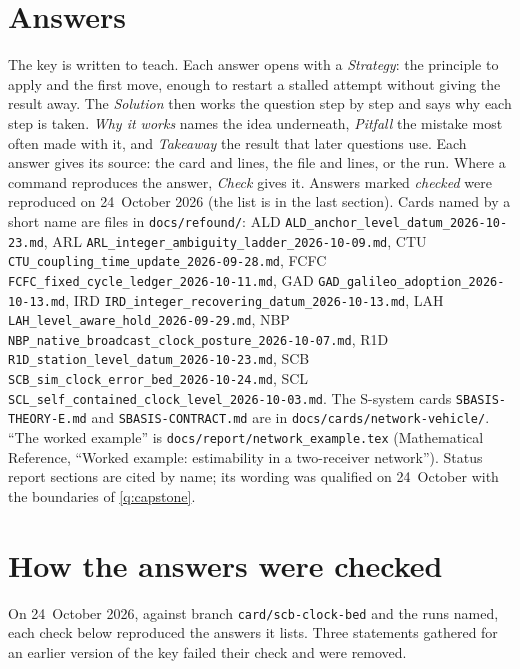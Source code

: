 \documentclass[11pt,letterpaper]{article}
\newcounter{question}[section]
\begin{document}
\clearpage
\section*{Answers}
The key is written to teach. Each answer opens with a \emph{Strategy}: the
principle to apply and the first move, enough to restart a stalled attempt
without giving the result away. The \emph{Solution} then works the question
step by step and says why each step is taken. \emph{Why it works} names the
idea underneath, \emph{Pitfall} the mistake most often made with it, and
\emph{Takeaway} the result that later questions use. Each answer gives its
source: the card and lines, the file and lines, or the run. Where a command
reproduces the answer, \emph{Check} gives it. Answers
marked \emph{checked} were reproduced on 24~October 2026 (the list is in the
last section). Cards named by a short name are files in \texttt{docs/refound/}:
ALD \texttt{ALD\_anchor\_level\_datum\_2026-10-23.md}, ARL
\texttt{ARL\_integer\_ambiguity\_ladder\_2026-10-09.md}, CTU
\texttt{CTU\_coupling\_time\_update\_2026-09-28.md}, FCFC
\texttt{FCFC\_fixed\_cycle\_ledger\_2026-10-11.md}, GAD
\texttt{GAD\_galileo\_adoption\_2026-10-13.md}, IRD
\texttt{IRD\_integer\_recovering\_datum\_2026-10-13.md}, LAH
\texttt{LAH\_level\_aware\_hold\_2026-09-29.md}, NBP
\texttt{NBP\_native\_broadcast\_clock\_posture\_2026-10-07.md}, R1D
\texttt{R1D\_station\_level\_datum\_2026-10-23.md}, SCB
\texttt{SCB\_sim\_clock\_error\_bed\_2026-10-24.md}, SCL
\texttt{SCL\_self\_contained\_clock\_level\_2026-10-03.md}. The S-system cards
\texttt{SBASIS-THEORY-E.md} and \texttt{SBASIS-CONTRACT.md} are in
\texttt{docs/cards/network-vehicle/}. ``The worked example'' is
\texttt{docs/report/network\_example.tex} (Mathematical Reference, ``Worked
example: estimability in a two-receiver network''). Status report sections are
cited by name; its wording was qualified on 24~October with the boundaries of
\cref{q:capstone}.




\section*{How the answers were checked}
On 24~October 2026, against branch \texttt{card/scb-clock-bed} and the runs
named, each check below reproduced the answers it lists. Three statements
gathered for an earlier version of the key failed their check and were removed.
\end{document}
